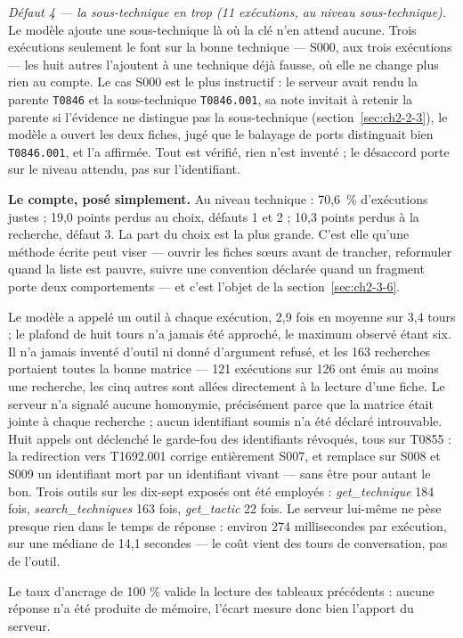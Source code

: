 \emph{Défaut 4 --- la sous-technique en trop (11 exécutions, au niveau sous-technique).} Le modèle ajoute une sous-technique là où la clé n'en attend aucune. Trois exécutions seulement le font sur la bonne technique --- S000, aux trois exécutions --- les huit autres l'ajoutent à une technique déjà fausse, où elle ne change plus rien au compte. Le cas S000 est le plus instructif : le serveur avait rendu la parente \texttt{T0846} et la sous-technique \texttt{T0846.001}, sa note invitait à retenir la parente si l'évidence ne distingue pas la sous-technique (section~\ref{sec:ch2-2-3}), le modèle a ouvert les deux fiches, jugé que le balayage de ports distinguait bien \texttt{T0846.001}, et l'a affirmée. Tout est vérifié, rien n'est inventé ; le désaccord porte sur le niveau attendu, pas sur l'identifiant.

\textbf{Le compte, posé simplement.} Au niveau technique : 70,6~\% d'exécutions justes ; 19,0 points perdus au choix, défauts 1 et 2 ; 10,3 points perdus à la recherche, défaut 3. La part du choix est la plus grande. C'est elle qu'une méthode écrite peut viser --- ouvrir les fiches sœurs avant de trancher, reformuler quand la liste est pauvre, suivre une convention déclarée quand un fragment porte deux comportements --- et c'est l'objet de la section~\ref{sec:ch2-3-6}.

Le modèle a appelé un outil à chaque exécution, 2,9 fois en moyenne sur 3,4 tours ; le plafond de huit tours n'a jamais été approché, le maximum observé étant six. Il n'a jamais inventé d'outil ni donné d'argument refusé, et les 163 recherches portaient toutes la bonne matrice --- 121 exécutions sur 126 ont émis au moins une recherche, les cinq autres sont allées directement à la lecture d'une fiche. Le serveur n'a signalé aucune homonymie, précisément parce que la matrice était jointe à chaque recherche ; aucun identifiant soumis n'a été déclaré introuvable. Huit appels ont déclenché le garde-fou des identifiants révoqués, tous sur T0855 : la redirection vers T1692.001 corrige entièrement S007, et remplace sur S008 et S009 un identifiant mort par un identifiant vivant --- sans être pour autant le bon. Trois outils sur les dix-sept exposés ont été employés : \emph{get\_technique} 184 fois, \emph{search\_techniques} 163 fois, \emph{get\_tactic} 22 fois. Le serveur lui-même ne pèse presque rien dans le temps de réponse : environ 274 millisecondes par exécution, sur une médiane de 14,1 secondes --- le coût vient des tours de conversation, pas de l'outil.

Le taux d'ancrage de 100 \% valide la lecture des tableaux précédents : aucune réponse n'a été produite de mémoire, l'écart mesure donc bien l'apport du serveur.

